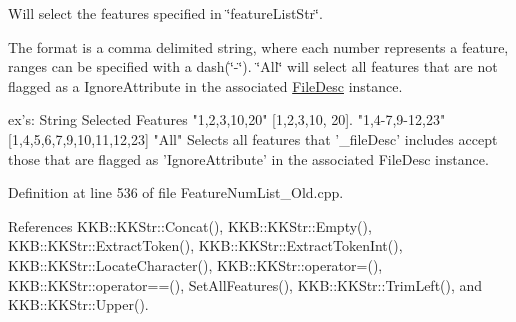 Will select the features specified in \char`\"{}feature\+List\+Str\char`\"{}. 

The format is a comma delimited string, where each number represents a feature, ranges can be specified with a dash(\char`\"{}-\/\char`\"{}). \char`\"{}\+All\char`\"{} will select all features that are not flagged as a \textquotesingle{}Ignore\+Attribute\textquotesingle{} in the associated \hyperlink{class_k_k_m_l_l_1_1_file_desc}{File\+Desc} instance. 
\begin{DoxyCode}
ex\textcolor{stringliteral}{'s:   String          Selected Features}
\textcolor{stringliteral}{       "1,2,3,10,20"    [1,2,3,10, 20].}
\textcolor{stringliteral}{       "1,4-7,9-12,23"  [1,4,5,6,7,9,10,11,12,23]}
\textcolor{stringliteral}{       "All"            Selects all features that '}\_fileDesc\textcolor{stringliteral}{' includes accept those that are}
\textcolor{stringliteral}{                        flagged as '}IgnoreAttribute\textcolor{stringliteral}{' in the associated FileDesc instance.}
\end{DoxyCode}
 

Definition at line 536 of file Feature\+Num\+List\+\_\+\+Old.\+cpp.



References K\+K\+B\+::\+K\+K\+Str\+::\+Concat(), K\+K\+B\+::\+K\+K\+Str\+::\+Empty(), K\+K\+B\+::\+K\+K\+Str\+::\+Extract\+Token(), K\+K\+B\+::\+K\+K\+Str\+::\+Extract\+Token\+Int(), K\+K\+B\+::\+K\+K\+Str\+::\+Locate\+Character(), K\+K\+B\+::\+K\+K\+Str\+::operator=(), K\+K\+B\+::\+K\+K\+Str\+::operator==(), Set\+All\+Features(), K\+K\+B\+::\+K\+K\+Str\+::\+Trim\+Left(), and K\+K\+B\+::\+K\+K\+Str\+::\+Upper().


